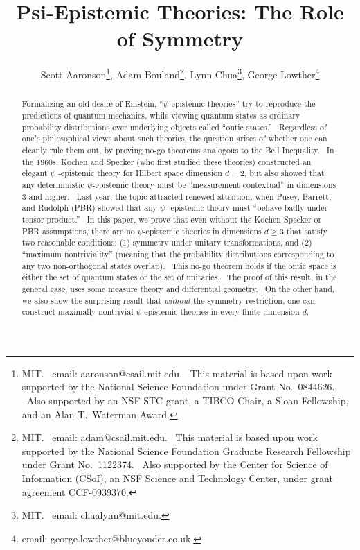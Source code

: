 \documentclass[letterpaper,11pt]{article}
\begin{document}
\title{Psi-Epistemic Theories: The Role of Symmetry}
\author{ Scott Aaronson\thanks{%
MIT. \ email: aaronson@csail.mit.edu. \ This material is based upon work
supported by the National Science Foundation under Grant No.\ 0844626. \ Also
supported by an NSF STC grant, a TIBCO Chair, a Sloan
Fellowship, and an Alan T.\ Waterman Award.},  Adam Bouland\thanks{%
MIT. \ email: adam@csail.mit.edu. \ This material is based upon work supported
by the National Science Foundation Graduate Research Fellowship under Grant
No.\ 1122374. \ Also supported by the Center for Science of Information
(CSoI), an NSF Science and Technology Center, under grant agreement
CCF-0939370.},  Lynn Chua\thanks{%
MIT. \ email: chualynn@mit.edu.},  George Lowther\thanks{%
email: george.lowther@blueyonder.co.uk.}}
\date{}
\maketitle

\begin{abstract}
Formalizing an old desire of Einstein, ``$\psi$-epistemic theories'' try to
reproduce the predictions of quantum mechanics, while viewing quantum states
as ordinary probability distributions over underlying objects called ``ontic
states.'' \ Regardless of one's philosophical views about such theories, the
question arises of whether one can cleanly rule them out, by proving no-go
theorems analogous to the Bell Inequality. \ In the 1960s, Kochen and
Specker (who first studied these theories) constructed an elegant $\psi$%
-epistemic theory for Hilbert space dimension $d=2$, but also showed that
any deterministic $\psi$-epistemic theory must be ``measurement contextual''
in dimensions $3$ and higher. \ Last year, the topic attracted renewed
attention, when Pusey, Barrett, and Rudolph (PBR) showed that any $\psi$%
-epistemic theory must ``behave badly under tensor product.'' \ In this
paper, we prove that even without the Kochen-Specker or PBR assumptions,
there are no $\psi$-epistemic theories in dimensions $d\geq 3$ that satisfy
two reasonable conditions: (1) symmetry under unitary transformations, and
(2) ``maximum nontriviality'' (meaning that the probability distributions
corresponding to any two non-orthogonal states overlap). \ This no-go theorem
holds if the ontic space is either the set of quantum states or the set of unitaries. \ The proof of this result, in
the general case, uses some measure theory and differential geometry. \ On the other
hand, we also show the surprising result that \emph{without} the symmetry
restriction, one can construct maximally-nontrivial $\psi$-epistemic
theories in every finite dimension $d$.
\end{abstract}
\end{document}
